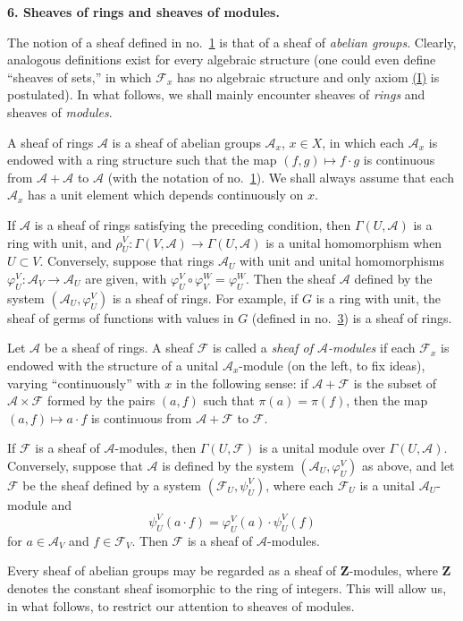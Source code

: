 
\medskip
{}\label{fac:I:1:no:6}
\textbf{6. Sheaves of rings and sheaves of modules.}

The notion of a sheaf defined in no.~\hyperref[fac:I:1:no:1]{1} is that of a sheaf of \textit{abelian groups}. Clearly, analogous definitions exist for every algebraic structure (one could even define ``sheaves of sets,'' in which $\mathcal{F}_x$ has no algebraic structure and only axiom \hyperref[fac:I:1:no:1:axiom:I]{(I)} is postulated). In what follows, we shall mainly encounter sheaves of \textit{rings} and sheaves of \textit{modules}.

A sheaf of rings $\mathcal{A}$ is a sheaf of abelian groups $\mathcal{A}_x$, $x\in X$, in which each $\mathcal{A}_x$ is endowed with a ring structure such that the map $(f,g)\mapsto f\cdot g$ is continuous from $\mathcal{A}+\mathcal{A}$ to $\mathcal{A}$ (with the notation of no.~\hyperref[fac:I:1:no:1]{1}). We shall always assume that each $\mathcal{A}_x$ has a unit element which depends continuously on $x$.

If $\mathcal{A}$ is a sheaf of rings satisfying the preceding condition, then $\Gamma(U,\mathcal{A})$ is a ring with unit, and $\rho_U^V:\Gamma(V,\mathcal{A})\to\Gamma(U,\mathcal{A})$ is a unital homomorphism when $U\subset V$. Conversely, suppose that rings $\mathcal{A}_U$ with unit and unital homomorphisms $\varphi_U^V:\mathcal{A}_V\to\mathcal{A}_U$ are given, with $\varphi_U^V\circ\varphi_V^W=\varphi_U^W$. Then the sheaf $\mathcal{A}$ defined by the system $(\mathcal{A}_U,\varphi_U^V)$ is a sheaf of rings. For example, if $G$ is a ring with unit, the sheaf of germs of functions with values in $G$ (defined in no.~\hyperref[fac:I:1:no:3]{3}) is a sheaf of rings.

Let $\mathcal{A}$ be a sheaf of rings. A sheaf $\mathcal{F}$ is called a \textit{sheaf of $\mathcal{A}$-modules} if each $\mathcal{F}_x$ is endowed with the structure of a unital $\mathcal{A}_x$-module (on the left, to fix ideas), varying ``continuously'' with $x$ in the following sense: if $\mathcal{A}+\mathcal{F}$ is the subset of $\mathcal{A}\times\mathcal{F}$ formed by the pairs $(a,f)$ such that $\pi(a)=\pi(f)$, then the map $(a,f)\mapsto a\cdot f$ is continuous from $\mathcal{A}+\mathcal{F}$ to $\mathcal{F}$.

If $\mathcal{F}$ is a sheaf of $\mathcal{A}$-modules, then $\Gamma(U,\mathcal{F})$ is a unital module over $\Gamma(U,\mathcal{A})$. Conversely, suppose that $\mathcal{A}$ is defined by the system $(\mathcal{A}_U,\varphi_U^V)$ as above, and let $\mathcal{F}$ be the sheaf defined by a system $(\mathcal{F}_U,\psi_U^V)$, where each $\mathcal{F}_U$ is a unital $\mathcal{A}_U$-module and
\begin{equation*}
\psi_U^V(a\cdot f)=\varphi_U^V(a)\cdot\psi_U^V(f)
\end{equation*}
for $a\in\mathcal{A}_V$ and $f\in\mathcal{F}_V$. Then $\mathcal{F}$ is a sheaf of $\mathcal{A}$-modules.

Every sheaf of abelian groups may be regarded as a sheaf of $\mathbf{Z}$-modules, where $\mathbf{Z}$ denotes the constant sheaf isomorphic to the ring of integers. This will allow us, in what follows, to restrict our attention to sheaves of modules.
